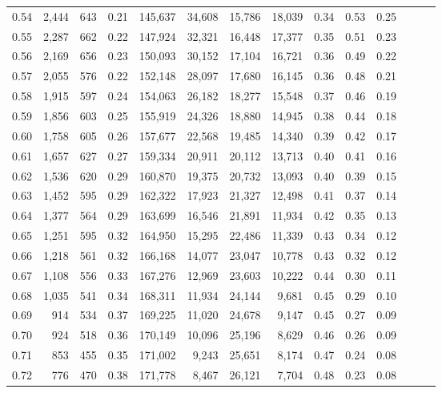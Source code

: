 \begin{tabular}{rrrrrrrrrrrrrr}
0.54 &  2,444 &  643 &  0.21 &  145,637 &   34,608 &  15,786 &  18,039 &  0.34 &  0.53 &      0.25 \\
0.55 &  2,287 &  662 &  0.22 &  147,924 &   32,321 &  16,448 &  17,377 &  0.35 &  0.51 &      0.23 \\
0.56 &  2,169 &  656 &  0.23 &  150,093 &   30,152 &  17,104 &  16,721 &  0.36 &  0.49 &      0.22 \\
0.57 &  2,055 &  576 &  0.22 &  152,148 &   28,097 &  17,680 &  16,145 &  0.36 &  0.48 &      0.21 \\
0.58 &  1,915 &  597 &  0.24 &  154,063 &   26,182 &  18,277 &  15,548 &  0.37 &  0.46 &      0.19 \\
0.59 &  1,856 &  603 &  0.25 &  155,919 &   24,326 &  18,880 &  14,945 &  0.38 &  0.44 &      0.18 \\
0.60 &  1,758 &  605 &  0.26 &  157,677 &   22,568 &  19,485 &  14,340 &  0.39 &  0.42 &      0.17 \\
0.61 &  1,657 &  627 &  0.27 &  159,334 &   20,911 &  20,112 &  13,713 &  0.40 &  0.41 &      0.16 \\
0.62 &  1,536 &  620 &  0.29 &  160,870 &   19,375 &  20,732 &  13,093 &  0.40 &  0.39 &      0.15 \\
0.63 &  1,452 &  595 &  0.29 &  162,322 &   17,923 &  21,327 &  12,498 &  0.41 &  0.37 &      0.14 \\
0.64 &  1,377 &  564 &  0.29 &  163,699 &   16,546 &  21,891 &  11,934 &  0.42 &  0.35 &      0.13 \\
0.65 &  1,251 &  595 &  0.32 &  164,950 &   15,295 &  22,486 &  11,339 &  0.43 &  0.34 &      0.12 \\
0.66 &  1,218 &  561 &  0.32 &  166,168 &   14,077 &  23,047 &  10,778 &  0.43 &  0.32 &      0.12 \\
0.67 &  1,108 &  556 &  0.33 &  167,276 &   12,969 &  23,603 &  10,222 &  0.44 &  0.30 &      0.11 \\
0.68 &  1,035 &  541 &  0.34 &  168,311 &   11,934 &  24,144 &   9,681 &  0.45 &  0.29 &      0.10 \\
0.69 &    914 &  534 &  0.37 &  169,225 &   11,020 &  24,678 &   9,147 &  0.45 &  0.27 &      0.09 \\
0.70 &    924 &  518 &  0.36 &  170,149 &   10,096 &  25,196 &   8,629 &  0.46 &  0.26 &      0.09 \\
0.71 &    853 &  455 &  0.35 &  171,002 &    9,243 &  25,651 &   8,174 &  0.47 &  0.24 &      0.08 \\
0.72 &    776 &  470 &  0.38 &  171,778 &    8,467 &  26,121 &   7,704 &  0.48 &  0.23 &      0.08 \\

\end{tabular}
